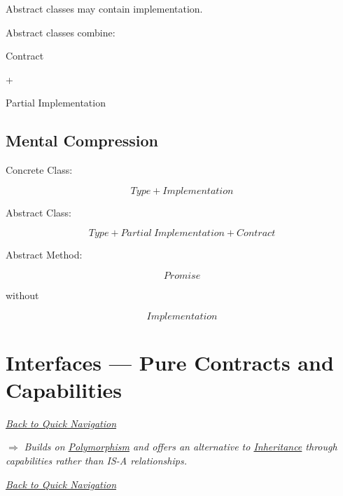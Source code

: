 \documentclass[11pt,a4paper]{book}
\begin{document}
\begin{rosettarule}

Abstract classes may contain implementation.

\end{rosettarule}

\begin{rosettarule}

Abstract classes combine:

Contract

+

Partial Implementation

\end{rosettarule}


\section{Mental Compression}

Concrete Class:

\[
Type
+
Implementation
\]


Abstract Class:

\[
Type
+
Partial\ Implementation
+
Contract
\]


Abstract Method:

\[
Promise
\]

without

\[
Implementation
\]

\chapter{Interfaces --- Pure Contracts and Capabilities}\label{chap:interfaces}

\smallskip
\noindent
\hyperref[sec:quick_nav]{\emph{Back to Quick Navigation}}

\smallskip
\noindent
\textcolor{RosettaRoyalPurple}{$\Rightarrow$}
\emph{Builds on \hyperref[chap:polymorphism]{Polymorphism} and offers an alternative to \hyperref[chap:inheritance]{Inheritance} through capabilities rather than IS-A relationships.}

\smallskip
\noindent
\hyperref[sec:quick_nav]{\emph{Back to Quick Navigation}}
\end{document}
